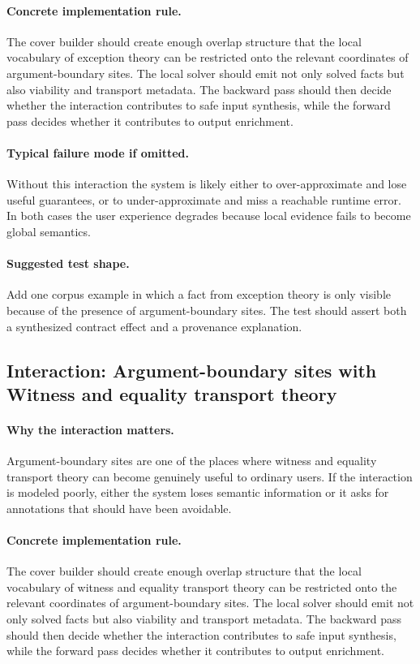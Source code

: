 \documentclass[11pt]{report}
\theoremstyle{definition}
\theoremstyle{plain}
\begin{document}
\paragraph{Concrete implementation rule.}
The cover builder should create enough overlap structure that the local
vocabulary of exception theory can be restricted onto the relevant
coordinates of argument-boundary sites. The local solver should emit not only
solved facts but also viability and transport metadata. The backward pass
should then decide whether the interaction contributes to safe input
synthesis, while the forward pass decides whether it contributes to output
enrichment.

\paragraph{Typical failure mode if omitted.}
Without this interaction the system is likely either to over-approximate and
lose useful guarantees, or to under-approximate and miss a reachable runtime
error. In both cases the user experience degrades because local evidence
fails to become global semantics.

\paragraph{Suggested test shape.}
Add one corpus example in which a fact from exception theory is only
visible because of the presence of argument-boundary sites. The test should
assert both a synthesized contract effect and a provenance explanation.

\subsection{Interaction: Argument-boundary sites with Witness and equality transport theory}

\paragraph{Why the interaction matters.}
Argument-boundary sites are one of the places where witness and equality transport theory can become
genuinely useful to ordinary users. If the interaction is modeled poorly,
either the system loses semantic information or it asks for annotations that
should have been avoidable.

\paragraph{Concrete implementation rule.}
The cover builder should create enough overlap structure that the local
vocabulary of witness and equality transport theory can be restricted onto the relevant
coordinates of argument-boundary sites. The local solver should emit not only
solved facts but also viability and transport metadata. The backward pass
should then decide whether the interaction contributes to safe input
synthesis, while the forward pass decides whether it contributes to output
enrichment.
\end{document}
